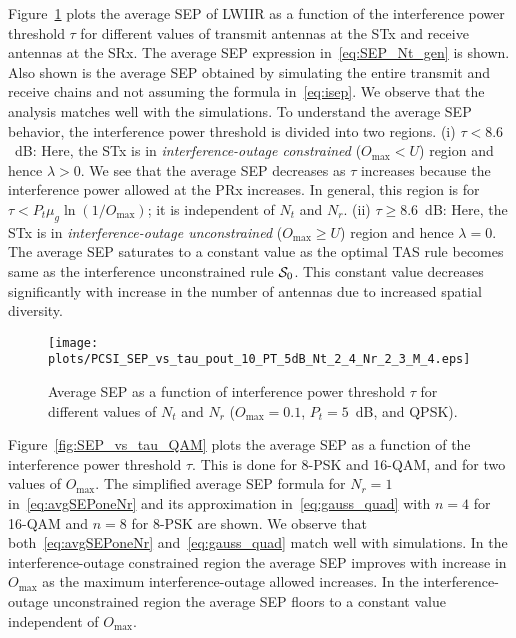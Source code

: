 \documentclass[12pt,draftcls,peerreview,onecolumn]{IEEEtran}
\newcommand{\lam}{\lambda}
\newcommand{\mug}{{\mu_{g}}}
\newcommand{\Nt}{{N_t}}
\newcommand{\Nr}{{N_r}}
\newcommand{\Pt}{{P_t}}
\newcommand{\outmax}{O_{\text{max}}}
\newcommand{\itau}{\tau}
\newcommand{\un}{U}
\newcommand{\caluncons}{{\cal S_{\text{0}}}}
\begin{document}


Figure~\ref{fig:SEP_vs_tau} plots the average SEP of LWIIR as a function of the interference power threshold $\itau$ for different values of transmit antennas at the STx and receive antennas at the SRx. The average SEP expression in~\eqref{eq:SEP_Nt_gen} is shown. Also shown is the average SEP obtained by simulating the entire transmit and receive chains and not assuming the formula in~\eqref{eq:isep}. We observe that the analysis matches well with the simulations. To understand the average SEP behavior, the interference power threshold is divided into two regions. (i) $\itau < 8.6$~dB: Here, the STx is in {\em interference-outage constrained} ($\outmax < \un$) region and hence $\lam>0$. We see that the average SEP decreases as $\itau$ increases because the interference power allowed at the PRx increases. 
In general, this region is for $\itau < \Pt\mug\ln\left(1/\outmax\right)$; it is independent of $\Nt$ and $\Nr$.
(ii) $\itau \geq 8.6$~dB: Here, the STx is in {\em interference-outage unconstrained} ($\outmax \geq \un$) region and hence $\lam=0$. The average SEP saturates to a constant value as the optimal TAS rule becomes same as the interference unconstrained rule $\caluncons$. This constant value decreases significantly with increase in the number of antennas due to increased spatial diversity.

\begin{figure}
  \centering \texttt{[image: plots/PCSI\_SEP\_vs\_tau\_pout\_10\_PT\_5dB\_Nt\_2\_4\_Nr\_2\_3\_M\_4.eps]}
  \caption{Average SEP as a function of interference power threshold $\itau$ for different values of $\Nt$ and $\Nr$ ($\outmax=0.1$,  $\Pt = 5$~dB, and QPSK).}
\label{fig:SEP_vs_tau}
\end{figure}

Figure~\ref{fig:SEP_vs_tau_QAM} plots the average SEP as a function of the interference power threshold $\tau$. This is done for 8-PSK and 16-QAM, and for two values of $\outmax$. The simplified average SEP formula for $\Nr=1$ in~\eqref{eq:avgSEPoneNr} and its approximation in~\eqref{eq:gauss_quad} with $n = 4$ for 16-QAM and $n=8$ for 8-PSK  are shown. We observe that both~\eqref{eq:avgSEPoneNr} and~\eqref{eq:gauss_quad} match well with simulations. In the interference-outage constrained region the average SEP improves with increase in $\outmax$ as the maximum interference-outage allowed increases. In the interference-outage unconstrained region the average SEP floors to a constant value independent of $\outmax$.  %
\end{document}
